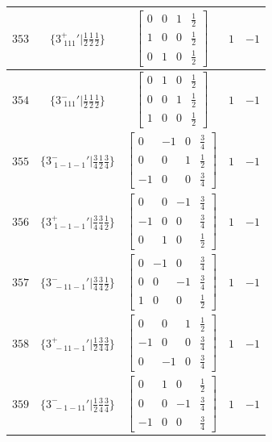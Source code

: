 \documentclass[fleqn,8pt]{jsarticle}
\begin{document}
\begin{longtable}{ccccc}
$ 353 $ & $ \{3^{+}_{\,\,111}{}'|\frac{1}{2} \frac{1}{2} \frac{1}{2}\} $ & $ \begin{bmatrix} 0 & 0 & 1 & \frac{1}{2} \\ 1 & 0 & 0 & \frac{1}{2} \\ 0 & 1 & 0 & \frac{1}{2} \end{bmatrix} $ & $ 1 $ & $ -1 $ \\ \hline
$ 354 $ & $ \{3^{-}_{\,\,111}{}'|\frac{1}{2} \frac{1}{2} \frac{1}{2}\} $ & $ \begin{bmatrix} 0 & 1 & 0 & \frac{1}{2} \\ 0 & 0 & 1 & \frac{1}{2} \\ 1 & 0 & 0 & \frac{1}{2} \end{bmatrix} $ & $ 1 $ & $ -1 $ \\ \hline
$ 355 $ & $ \{3^{-}_{\,\,1-1-1}{}'|\frac{3}{4} \frac{1}{2} \frac{3}{4}\} $ & $ \begin{bmatrix} 0 & -1 & 0 & \frac{3}{4} \\ 0 & 0 & 1 & \frac{1}{2} \\ -1 & 0 & 0 & \frac{3}{4} \end{bmatrix} $ & $ 1 $ & $ -1 $ \\ \hline
$ 356 $ & $ \{3^{+}_{\,\,1-1-1}{}'|\frac{3}{4} \frac{3}{4} \frac{1}{2}\} $ & $ \begin{bmatrix} 0 & 0 & -1 & \frac{3}{4} \\ -1 & 0 & 0 & \frac{3}{4} \\ 0 & 1 & 0 & \frac{1}{2} \end{bmatrix} $ & $ 1 $ & $ -1 $ \\ \hline
$ 357 $ & $ \{3^{-}_{\,\,-11-1}{}'|\frac{3}{4} \frac{3}{4} \frac{1}{2}\} $ & $ \begin{bmatrix} 0 & -1 & 0 & \frac{3}{4} \\ 0 & 0 & -1 & \frac{3}{4} \\ 1 & 0 & 0 & \frac{1}{2} \end{bmatrix} $ & $ 1 $ & $ -1 $ \\ \hline
$ 358 $ & $ \{3^{+}_{\,\,-11-1}{}'|\frac{1}{2} \frac{3}{4} \frac{3}{4}\} $ & $ \begin{bmatrix} 0 & 0 & 1 & \frac{1}{2} \\ -1 & 0 & 0 & \frac{3}{4} \\ 0 & -1 & 0 & \frac{3}{4} \end{bmatrix} $ & $ 1 $ & $ -1 $ \\ \hline
$ 359 $ & $ \{3^{-}_{\,\,-1-11}{}'|\frac{1}{2} \frac{3}{4} \frac{3}{4}\} $ & $ \begin{bmatrix} 0 & 1 & 0 & \frac{1}{2} \\ 0 & 0 & -1 & \frac{3}{4} \\ -1 & 0 & 0 & \frac{3}{4} \end{bmatrix} $ & $ 1 $ & $ -1 $ \\ \hline

\end{longtable}
\end{document}
